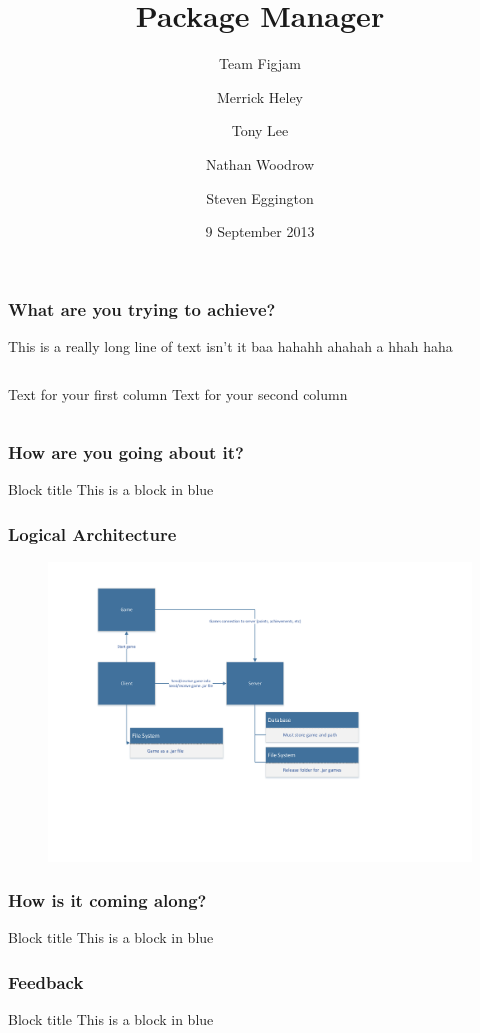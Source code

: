 \documentclass{beamer}
\title{Package Manager}
\subtitle{Team Figjam}
\author{\fontsize{10}{1}\selectfont
        Merrick Heley
        \and
        Tony Lee
        \and
        Nathan Woodrow
        \and
        Steven Eggington
        }
\institute{DECO2800 - Design Computing Studio 2}
\date{9 September 2013}
\begin{document}
\begin{frame}
    \titlepage
\end{frame}

\begin{frame}
    \frametitle{What are you trying to achieve?}
    
    This is a really long line of text isn't it baa hahahh ahahah a hhah haha
    \\
    
    \begin{columns}
            Text for your first column
            Text for your second column
    \end{columns}
    
\end{frame}

\begin{frame}
    \frametitle{How are you going about it?}
    
    \begin{block}{Block title}
        This is a block in blue
    \end{block}
\end{frame}

\begin{frame}
    \frametitle{Logical Architecture}
    
    \begin{figure}[!hbp]
        \centering
        \includegraphics[trim=3cm 5cm 5cm 2cm,
                         clip=true,
                         width=\textwidth]{logarch.pdf}
    \end{figure}
    
\end{frame}

\begin{frame}
    \frametitle{How is it coming along?}
    
    \begin{block}{Block title}
        This is a block in blue
    \end{block}
\end{frame}

\begin{frame}
    \frametitle{Feedback}
    
    \begin{block}{Block title}
        This is a block in blue
    \end{block}
\end{frame}
\end{document}
